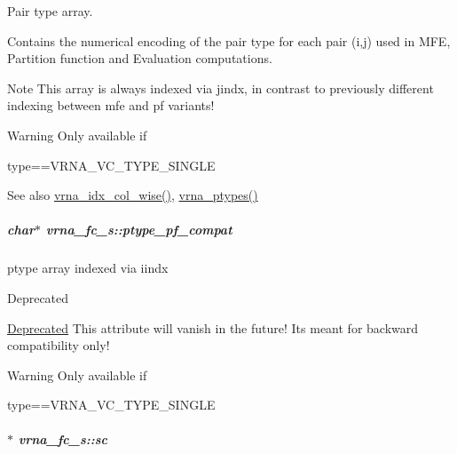 Pair type array. 

Contains the numerical encoding of the pair type for each pair (i,j) used in M\+F\+E, Partition function and Evaluation computations. \begin{DoxyNote}{Note}
This array is always indexed via jindx, in contrast to previously different indexing between mfe and pf variants! 
\end{DoxyNote}
\begin{DoxyWarning}{Warning}
Only available if\begin{DoxyVerb}type==VRNA_VC_TYPE_SINGLE \end{DoxyVerb}
 
\end{DoxyWarning}
\begin{DoxySeeAlso}{See also}
\hyperlink{group__utils_ga89ebc69c52fa0c78c9e1974b0017746b}{vrna\+\_\+idx\+\_\+col\+\_\+wise()}, \hyperlink{alphabet_8h_a51a9e86a5f731f5f2f5584ee67cee4a8}{vrna\+\_\+ptypes()} 
\end{DoxySeeAlso}
\hypertarget{group__fold__compound_a7fe1235ce3d41287695f1ae1e283e8fc}{}
\subparagraph[{ptype\+\_\+pf\+\_\+compat}]{\setlength{\rightskip}{0pt plus 5cm}char$\ast$ vrna\+\_\+fc\+\_\+s\+::ptype\+\_\+pf\+\_\+compat}\label{group__fold__compound_a7fe1235ce3d41287695f1ae1e283e8fc}


ptype array indexed via iindx 

\begin{DoxyRefDesc}{Deprecated}
\item[\hyperlink{deprecated__deprecated000051}{Deprecated}]This attribute will vanish in the future! It\textquotesingle{}s meant for backward compatibility only! \begin{DoxyWarning}{Warning}
Only available if\begin{DoxyVerb}type==VRNA_VC_TYPE_SINGLE \end{DoxyVerb}
 
\end{DoxyWarning}
\end{DoxyRefDesc}
\hypertarget{group__fold__compound_ac7089e90460ad3990a308808c8044c9f}{}
\subparagraph[{sc}]{$\ast$ vrna\+\_\+fc\+\_\+s\+::sc}\label{group__fold__compound_ac7089e90460ad3990a308808c8044c9f}


